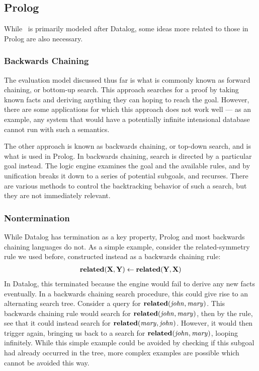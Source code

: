 \subsection{Prolog}
While \sysname\ is primarily modeled after Datalog, some ideas more related to those in Prolog are also necessary.
\subsubsection{Backwards Chaining}
\label{sec:bchain}
The evaluation model discussed thus far is what is commonly known as forward chaining, or bottom-up search.
This approach searches for a proof by taking known facts and deriving anything they can hoping to reach the goal.
However, there are some applications for which this approach does not work well --- as an example, any system that would have a potentially infinite intensional database cannot run with such a semantics.

The other approach is known as backwards chaining, or top-down search, and is what is used in Prolog.
In backwards chaining, search is directed by a particular goal instead.
The logic engine examines the goal and the available rules, and by unification breaks it down to a series of potential subgoals, and recurses.
There are various methods to control the backtracking behavior of such a search, but they are not immediately relevant.

\subsubsection{Nontermination}
While Datalog has termination as a key property, Prolog and most backwards chaining languages do not.
As a simple example, consider the related-symmetry rule we used before, constructed instead as a backwards chaining rule:
\begin{gather*}
        {\bf related}({\bf X}, {\bf Y}) \leftarrow {\bf related}({\bf Y}, {\bf X})
\end{gather*}
In Datalog, this terminated because the engine would fail to derive any new facts eventually.
In a backwards chaining search procedure, this could give rise to an alternating search tree.
Consider a query for ${\bf related}({\it john}, {\it mary})$.
This backwards chaining rule would search for ${\bf related}({\it john}, {\it mary})$, then by the rule, see that it could instead search for ${\bf related}({\it mary}, {\it john})$.
However, it would then trigger again, bringing us back to a search for ${\bf related}({\it john}, {\it mary})$, looping infinitely.
While this simple example could be avoided by checking if this subgoal had already occurred in the tree, more complex examples are possible which cannot be avoided this way.

